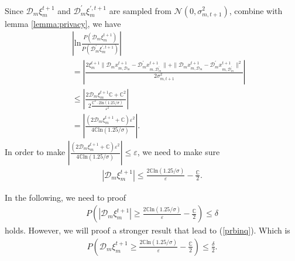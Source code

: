 Since $\mathcal{D}_m\xi_m^{t+1}$ and $\mathcal{D}_m^{\prime}\xi_m^{\prime,t+1}$ are sampled from $\mathcal{N}(0,\sigma_{m,t+1}^2)$,
combine with lemma \ref{lemma:privacy}, we have
\begin{eqnarray*}
&&\left|
  \text{ln}\frac{P(\mathcal{D}_m\xi_m^{t+1})}
  {P(\mathcal{D}_m^{\prime}\xi_m^{\prime,t+1})}
  \right|\\
&&=\left|
\frac{2\xi_m^{t+1}\|\mathcal{D}_mx_{m,\mathcal{D}_m}^{t+1}-\mathcal{D}_m^{\prime}x_{m,\mathcal{D}_m^{\prime}}^{t+1}\|+
\|\mathcal{D}_mx_{m,\mathcal{D}_m}^{t+1}-\mathcal{D}_m^{\prime}x_{m,\mathcal{D}_m^{\prime}}^{t+1}\|^2}
{2\sigma_{m,t+1}^2}
\right|\\
&&\leq
\left|
\frac{2\mathcal{D}_m\xi_m^{t+1}\mathbb{C}+\mathbb{C}^2}{2\frac{\mathbb{C}^2\cdot2\text{ln}(1.25/\sigma)}{\varepsilon^2}}
\right|\\
&&=\left|
\frac{(2\mathcal{D}_m\xi_m^{t+1}+\mathbb{C})\varepsilon^2}{4\mathbb{C}\text{ln}(1.25/\sigma)}
\right|.
\end{eqnarray*}
In order to make $\left|
\frac{(2\mathcal{D}_m\xi_m^{t+1}+\mathbb{C})\varepsilon^2}{4\mathbb{C}\text{ln}(1.25/\sigma)}
\right|\leq \varepsilon$, we need to make sure
\begin{eqnarray*}
  \left|
  \mathcal{D}_m\xi_m^{t+1}
  \right|
  \leq
  \frac{2\mathbb{C}\text{ln}(1.25/\sigma)}{\varepsilon}-\frac{\mathbb{C}}{2}.
\end{eqnarray*}

In the following, we need to proof
\begin{eqnarray}
\label{prbinq}
  P(\left|
  \mathcal{D}_m\xi_m^{t+1}
  \right|
  \geq
  \frac{2\mathbb{C}\text{ln}(1.25/\sigma)}{\varepsilon}-\frac{\mathbb{C}}{2})
  \leq\delta
\end{eqnarray}
holds. However, we will proof a stronger result that lead to
(\ref{prbinq}). Which is
\begin{eqnarray*}
   P(
  \mathcal{D}_m\xi_m^{t+1}
  \geq
  \frac{2\mathbb{C}\text{ln}(1.25/\sigma)}{\varepsilon}-\frac{\mathbb{C}}{2})
  \leq\frac{\delta}{2}.
\end{eqnarray*}

